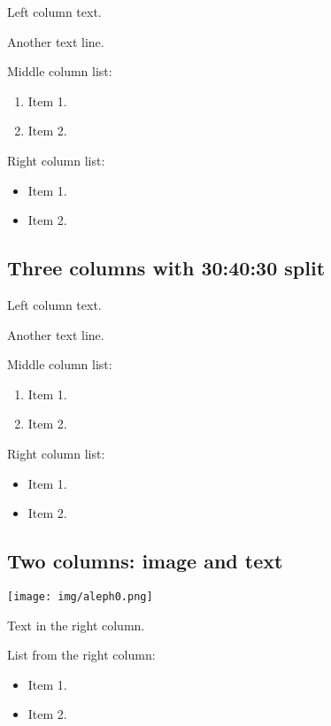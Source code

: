 \documentclass[
  11pt,
]{article}
\providecommand{\tightlist}{%
  \setlength{\itemsep}{0pt}\setlength{\parskip}{0pt}}
\begin{document}
Left column text.

Another text line.

Middle column list:

\begin{enumerate}
\def\labelenumi{\arabic{enumi}.}
\tightlist
\item
  Item 1.
\item
  Item 2.
\end{enumerate}

Right column list:

\begin{itemize}
\tightlist
\item
  Item 1.
\item
  Item 2.
\end{itemize}

\subsection{Three columns with 30:40:30
split}\label{three-columns-with-304030-split}

Left column text.

Another text line.

Middle column list:

\begin{enumerate}
\def\labelenumi{\arabic{enumi}.}
\tightlist
\item
  Item 1.
\item
  Item 2.
\end{enumerate}

Right column list:

\begin{itemize}
\tightlist
\item
  Item 1.
\item
  Item 2.
\end{itemize}

\subsection{Two columns: image and
text}\label{two-columns-image-and-text}

\texttt{[image: img/aleph0.png]}

Text in the right column.

List from the right column:

\begin{itemize}
\tightlist
\item
  Item 1.
\item
  Item 2.
\end{itemize}
\end{document}
